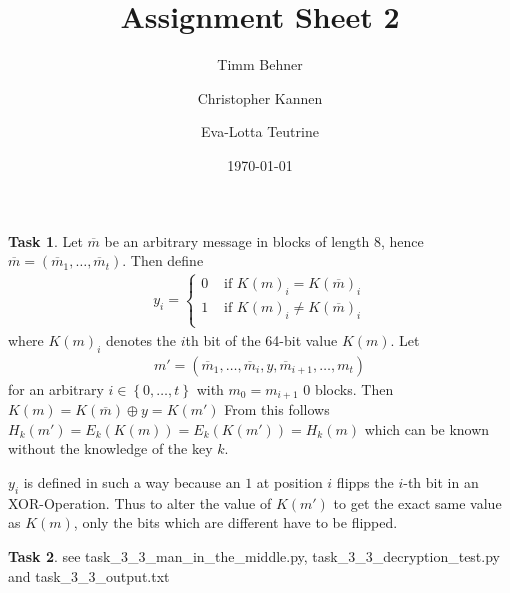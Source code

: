 \documentclass[fleqn]{scrartcl}
\title{Assignment Sheet 2}
\author{Timm Behner \and Christopher Kannen \and Eva-Lotta Teutrine}
\date{\today}
\theoremstyle{definition}
\newtheorem{exercise}{Task}
\begin{document}
\maketitle
\setcounter{exercise}{1}
\begin{exercise}
    Let $\overline m$ be an arbitrary message in blocks of length 8, hence
    $\overline m = \left( \overline m_1, \dots , \overline m_t \right)$. Then define
    \begin{align}
        y_i = \begin{cases}
            0 & \text{ if } K(m)_i = K(\overline m)_i \\
            1 & \text{ if } K(m)_i \neq K(\overline m)_i \\
        \end{cases}
    \end{align}
    where $K(m)_i$ denotes the $i$th bit of the 64-bit value $K(m)$. Let 
    \begin{align*}
        m' = \left( \overline m_1, \dots , \overline m_i, y , \overline m_{i+1}, \dots , m_t\right)
    \end{align*} 
    for an arbitrary $i \in \left\{ 0, \dots , t \right\}$ with $m_0 =
    m_{i+1}$ 0 blocks.
    Then $K(m) = K(\overline m) \oplus y = K(m')$ 
    From this follows $H_k(m') = E_k(K(m)) = E_k(K(m')) = H_k(m)$ which can be
    known without the knowledge of the key $k$.

    $y_i$ is defined in such a way because an $1$ at position $i$ flipps the
    $i$-th bit in an XOR-Operation. Thus to alter the value of $K(m')$ to get
    the exact same value as $K(m)$, only the bits which are different have to be
    flipped.
\end{exercise}

\begin{exercise}
    see task\_3\_3\_man\_in\_the\_middle.py, task\_3\_3\_decryption\_test.py and
    task\_3\_3\_output.txt
\end{exercise}
\end{document}
